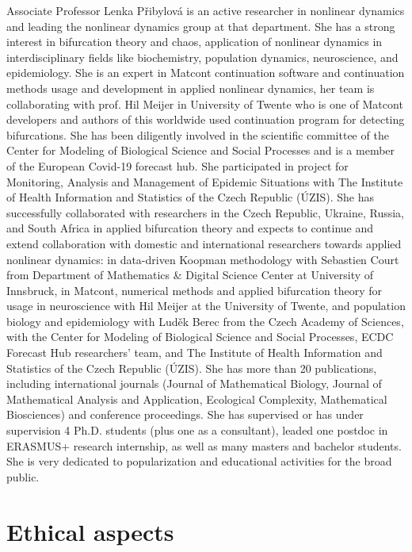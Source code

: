 \documentclass[a4paper,11pt]{scrartcl}
\begin{document}
Associate Professor Lenka Přibylová is an active researcher in nonlinear dynamics and leading the nonlinear dynamics group at that department. She has a strong interest in bifurcation theory and chaos, application of nonlinear dynamics in interdisciplinary fields like biochemistry, population dynamics, neuroscience, and epidemiology. She is an expert in Matcont continuation software and continuation methods usage and development in applied nonlinear dynamics, her team is collaborating with prof. Hil Meijer in University of Twente who is one of Matcont developers and authors of this worldwide used continuation program for detecting bifurcations. She has been diligently involved in the scientific committee of the Center for Modeling of Biological Science and Social Processes and is a member of the European Covid-19 forecast hub. She participated in project for Monitoring, Analysis and Management of Epidemic Situations with The Institute of Health Information and Statistics of the Czech Republic (ÚZIS). She has successfully collaborated with researchers in the Czech Republic, Ukraine, Russia, and South Africa in applied bifurcation theory and expects to continue and extend collaboration with domestic and international researchers towards applied nonlinear dynamics: in data-driven Koopman methodology with Sebastien Court from Department of Mathematics \& Digital Science Center at University of Innsbruck, in Matcont, numerical methods and applied bifurcation theory for usage in neuroscience with Hil Meijer at the University of Twente, and population biology and epidemiology with Luděk Berec from the Czech Academy of Sciences, with the Center for Modeling of Biological Science and Social Processes, ECDC Forecast Hub researchers’ team, and The Institute of Health Information and Statistics of the Czech Republic (ÚZIS). She has more than 20 publications, including international journals (Journal of Mathematical Biology, Journal of Mathematical Analysis and Application, Ecological Complexity, Mathematical Biosciences) and conference proceedings. She has supervised or has under supervision 4 Ph.D. students (plus one as a consultant), leaded one postdoc in ERASMUS+ research internship, as well as many masters and bachelor students. She is very dedicated to popularization and educational activities for the broad public.

\section{Ethical aspects}\label{sec:ethics}
\end{document}

